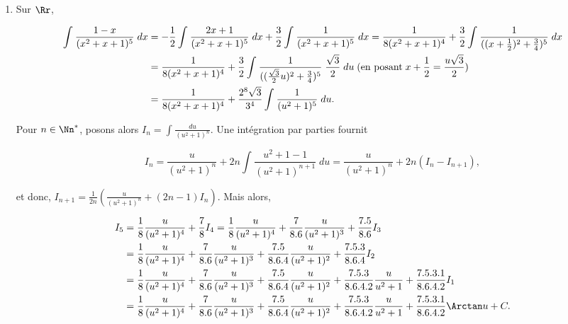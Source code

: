 {{\begin{enumerate}
Détermination de $a$, $b$ et $c$. La division euclidienne de $X^5$ par $X^3-X^2-X+1$ s'écrit $X^5=(X^2+X+2)(X^3-X^2-X+1)+2X^2+X-2$. On a donc $a=1$, $b=1$ et $c=2$.

$e=\lim_{x\rightarrow -1}(x+1)f(x)=\frac{(-1)^5}{(-1-1)^2}=-\frac{1}{4}$. Puis, $d_2=\lim_{x\rightarrow 1}(x-1)^2f(x)=\frac{1^5}{1+1}=\frac{1}{2}$. Enfin, $x=0$ fournit $0=c-d_1+d_2+e$ et donc, $d_1=-2-\frac{1}{2}+\frac{1}{4}=-\frac{9}{4}$. Finalement,

$$\frac{X^5}{X^3-X^2-X+1}=X^2+X+2-\frac{9}{4}\frac{1}{X-1}+\frac{1}{2}\frac{1}{(X-1)^2}-\frac{1}{4}\frac{1}{X+1},$$

et donc, $I$ désignant l'un des trois intervalles $]-\infty,-1[$, $]-1,1[$ ou $]1,+\infty[$, on a sur $I$

$$\int_{}^{}\frac{x^5}{x^3-x^2-x+1}\;dx=\frac{x^3}{3}+\frac{x^2}{2}+2x-\frac{1}{2(x-1)}-\frac{1}{4}\ln|x+1|+C.$$
\item  Sur $\Rr$,

\begin{align*}\ensuremath
\int_{}^{}\frac{1-x}{(x^2+x+1)^5}\;dx&=-\frac{1}{2}\int_{}^{}\frac{2x+1}{(x^2+x+1)^5}\;dx+\frac{3}{2}\int_{}^{}\frac{1}{(x^2+x+1)^5}\;dx
=\frac{1}{8(x^2+x+1)^4}+\frac{3}{2}\int_{}^{}\frac{1}{((x+\frac{1}{2})^2+\frac{3}{4})^5}\;dx\\
 &=\frac{1}{8(x^2+x+1)^4}+\frac{3}{2}\int_{}^{}\frac{1}{((\frac{\sqrt{3}}{2}u)^2+\frac{3}{4})^5}\;\frac{\sqrt{3}}{2}\;du\;(\mbox{en posant}\;x+\frac{1}{2}=\frac{u\sqrt{3}}{2})\\
 &=\frac{1}{8(x^2+x+1)^4}+\frac{2^8\sqrt{3}}{3^4}\int_{}^{}\frac{1}{(u^2+1)^5}\;du.
\end{align*}

Pour $n\in\Nn^*$, posons alors $I_n=\int_{}^{}\frac{du}{(u^2+1)^n}$. Une intégration par parties fournit

$$I_n=\frac{u}{(u^2+1)^n}+2n\int_{}^{}\frac{u^2+1-1}{(u^2+1)^{n+1}}\;du=\frac{u}{(u^2+1)^n}+2n(I_n-I_{n+1}),$$

et donc, $I_{n+1}=\frac{1}{2n}\left(\frac{u}{(u^2+1)^n}+(2n-1)I_n\right)$. Mais alors,

\begin{align*}\ensuremath
I_5&=\frac{1}{8}\frac{u}{(u^2+1)^4}+\frac{7}{8}I_4=\frac{1}{8}\frac{u}{(u^2+1)^4}+\frac{7}{8.6}\frac{u}{(u^2+1)^3}+\frac{7.5}{8.6}I_3\\
 &=\frac{1}{8}\frac{u}{(u^2+1)^4}+\frac{7}{8.6}\frac{u}{(u^2+1)^3}+\frac{7.5}{8.6.4}\frac{u}{(u^2+1)^2}+\frac{7.5.3}{8.6.4}I_2\\
 &=\frac{1}{8}\frac{u}{(u^2+1)^4}+\frac{7}{8.6}\frac{u}{(u^2+1)^3}+\frac{7.5}{8.6.4}\frac{u}{(u^2+1)^2}+\frac{7.5.3}{8.6.4.2}\frac{u}{u^2+1}+\frac{7.5.3.1}{8.6.4.2}I_1\\
 &=\frac{1}{8}\frac{u}{(u^2+1)^4}+\frac{7}{8.6}\frac{u}{(u^2+1)^3}+\frac{7.5}{8.6.4}\frac{u}{(u^2+1)^2}+\frac{7.5.3}{8.6.4.2}\frac{u}{u^2+1}+\frac{7.5.3.1}{8.6.4.2}\Arctan u+C.
\end{align*}


\end{enumerate}}}
